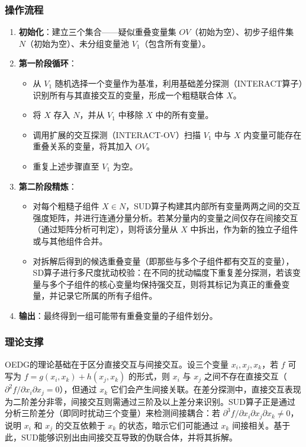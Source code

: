\subsubsection{操作流程}
\begin{enumerate}
    \item \textbf{初始化}：建立三个集合——疑似重叠变量集 $OV$（初始为空）、初步子组件集 $N$（初始为空）、未分组变量池 $V_1$（包含所有变量）。
    \item \textbf{第一阶段循环}：
        \begin{itemize}
            \item 从 $V_1$ 随机选择一个变量作为基准，利用基础差分探测（INTERACT算子）识别所有与其直接交互的变量，形成一个粗糙联合体 $X$。
            \item 将 $X$ 存入 $N$，并从 $V_1$ 中移除 $X$ 中的所有变量。
            \item 调用扩展的交互探测（INTERACT-OV）扫描 $V_1$ 中与 $X$ 内变量可能存在重叠关系的变量，将其加入 $OV$。
            \item 重复上述步骤直至 $V_1$ 为空。
        \end{itemize}
    \item \textbf{第二阶段精炼}：
        \begin{itemize}
            \item 对每个粗糙子组件 $X \in N$，SUD算子构建其内部所有变量两两之间的交互强度矩阵，并进行连通分量分析。若某分量内的变量之间仅存在间接交互（通过矩阵分析可判定），则将该分量从 $X$ 中拆出，作为新的独立子组件或与其他组件合并。
            \item 对拆解后得到的候选重叠变量（即那些与多个子组件都有交互的变量），SD算子进行多尺度扰动校验：在不同的扰动幅度下重复差分探测，若该变量与多个子组件的核心变量均保持强交互，则将其标记为真正的重叠变量，并记录它所属的所有子组件。
        \end{itemize}
    \item \textbf{输出}：最终得到一组可能带有重叠变量的子组件划分。
\end{enumerate}

\subsubsection{理论支撑}
OEDG的理论基础在于区分直接交互与间接交互。设三个变量 $x_i, x_j, x_k$，若 $f$ 可写为 $f = g(x_i, x_k) + h(x_j, x_k)$ 的形式，则 $x_i$ 与 $x_j$ 之间不存在直接交互（$\partial^2 f/\partial x_i \partial x_j = 0$），但通过 $x_k$ 它们会产生间接关联。在差分探测中，直接交互表现为二阶差分非零，间接交互则需通过三阶及以上差分来识别。SUD算子正是通过分析三阶差分（即同时扰动三个变量）来检测间接耦合：若 $\partial^3 f/\partial x_i \partial x_j \partial x_k \neq 0$，说明 $x_i$ 和 $x_j$ 的交互依赖于 $x_k$ 的状态，暗示它们可能通过 $x_k$ 间接相关。基于此，SUD能够识别出由间接交互导致的伪联合体，并将其拆解。

